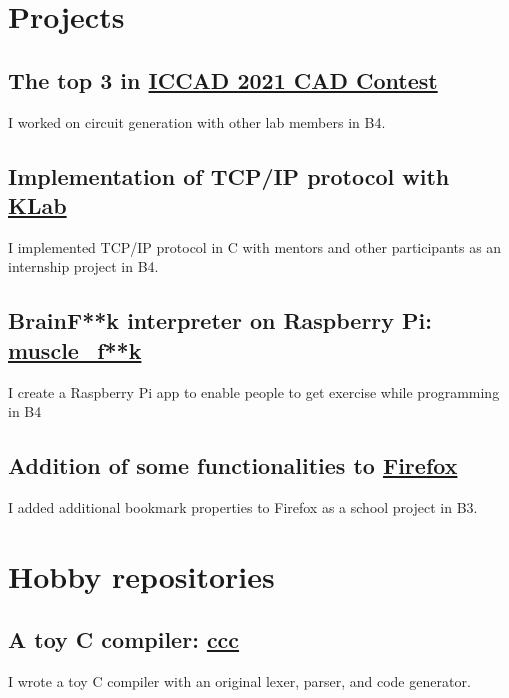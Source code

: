 \documentclass[12pt]{article}
\begin{document}
\section*{Projects}
  \subsection*{The top 3 in \href{http://iccad-contest.org/2021/}{ICCAD 2021 CAD Contest}}
    I worked on circuit generation with other lab members in B4.
  \subsection*{Implementation of TCP/IP protocol with \href{https://www.klab.com/en/}{KLab}}
    I implemented TCP/IP protocol in C with mentors and other participants as an internship project in B4.
  \subsection*{BrainF**k interpreter on Raspberry Pi: \href{https://github.com/diohabara/muscle_fuck}{muscle\_f**k}}
    I create a Raspberry Pi app to enable people to get exercise while programming in B4
  \subsection*{Addition of some functionalities to \href{https://slides.com/diohabara/deck}{Firefox}}
    I added additional bookmark properties to Firefox as a school project in B3.

\section*{Hobby repositories}
  \subsection*{A toy C compiler: \href{https://github.com/diohabara/ccc}{ccc}}
    I wrote a toy C compiler with an original lexer, parser, and code generator.
\end{document}
